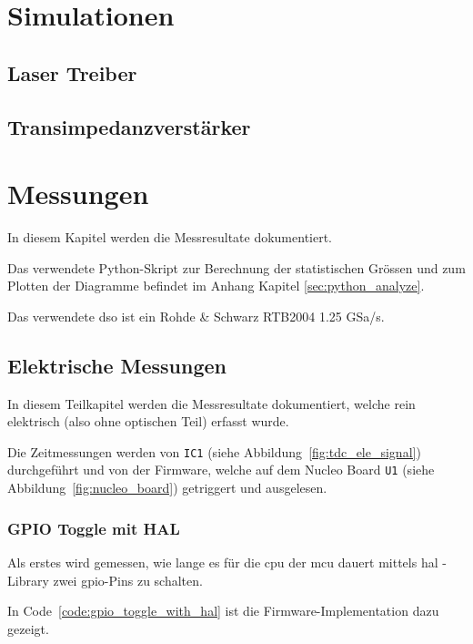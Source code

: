 \documentclass[11pt,a4paper,hidelinks]{article}
\begin{document}
\pagebreak

\section{Simulationen}

\subsection{Laser Treiber}
\subsection{Transimpedanzverstärker}

\pagebreak

\section{Messungen}

In diesem Kapitel werden die Messresultate dokumentiert.

Das verwendete Python-Skript zur Berechnung der statistischen Grössen und zum Plotten der Diagramme befindet im Anhang
Kapitel \ref{sec:python_analyze}.

Das verwendete \acrfull{dso} ist ein Rohde \& Schwarz RTB2004 1.25 GSa/s.

\subsection{Elektrische Messungen}

In diesem Teilkapitel werden die Messresultate dokumentiert, welche rein elektrisch (also ohne optischen Teil) erfasst
wurde.

Die Zeitmessungen werden von \lstinline|IC1| (siehe Abbildung~\ref{fig:tdc_ele_signal}) durchgeführt und von der
Firmware, welche auf dem Nucleo Board \lstinline|U1| (siehe Abbildung~\ref{fig:nucleo_board}) getriggert und ausgelesen.

\subsubsection{GPIO Toggle mit HAL}

Als erstes wird gemessen, wie lange es für die \acrshort{cpu} der \acrshort{mcu} dauert mittels \acrfull{hal} - Library
\cite{st2020stm32f0_hal} zwei \acrshort{gpio}-Pins zu schalten.

In Code~\ref{code:gpio_toggle_with_hal} ist die Firmware-Implementation dazu gezeigt.
\end{document}
